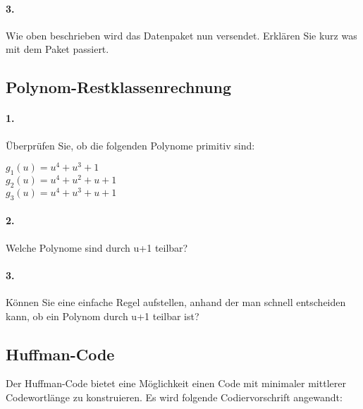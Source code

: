 \documentclass[paper=a4, fontsize=11pt]{scrartcl}
\numberwithin{equation}{section}
\numberwithin{figure}{section}
\numberwithin{table}{section}
\begin{document}
\paragraph{3.}
Wie oben beschrieben wird das Datenpaket nun versendet. Erklären Sie kurz was mit dem Paket passiert.

\subsection{Polynom-Restklassenrechnung}

\paragraph{1.}
Überprüfen Sie, ob die folgenden Polynome primitiv sind:

\begin{center}
$g_{1}(u)=u^{4}+u^{3}+1$ \\
$g_{2}(u)=u^{4}+u^{2}+u+1$ \\
$g_{3}(u)=u^{4}+u^{3}+u+1$ \\
\end{center}

\paragraph{2.}
Welche Polynome sind durch u+1 teilbar? \\

\paragraph{3.}
Können Sie eine einfache Regel aufstellen, anhand der man schnell entscheiden kann, ob ein Polynom durch u+1 teilbar ist? \\

\subsection{Huffman-Code}
Der Huffman-Code bietet eine Möglichkeit einen Code mit minimaler mittlerer Codewortlänge zu konstruieren. Es wird folgende Codiervorschrift angewandt: \\
\end{document}
